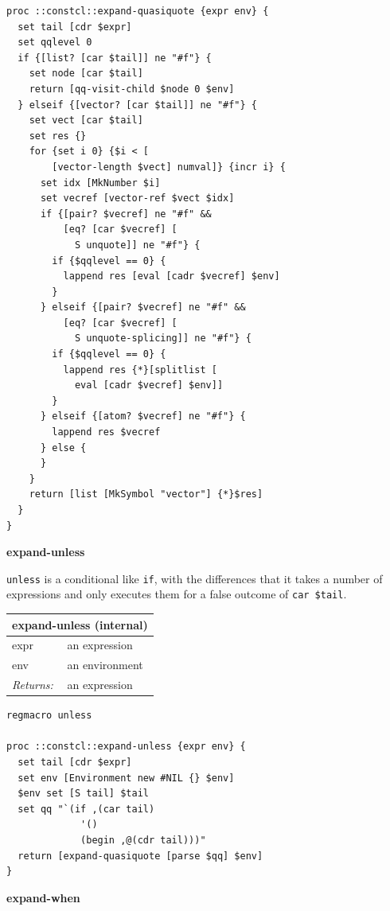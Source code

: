 \documentclass[twoside,9pt]{report}
\begin{document}
\noindent\makebox[\linewidth]{\rule{\linewidth}{0.4pt}}
\begin{lstlisting}
proc ::constcl::expand-quasiquote {expr env} {
  set tail [cdr $expr]
  set qqlevel 0
  if {[list? [car $tail]] ne "#f"} {
    set node [car $tail]
    return [qq-visit-child $node 0 $env]
  } elseif {[vector? [car $tail]] ne "#f"} {
    set vect [car $tail]
    set res {}
    for {set i 0} {$i < [
        [vector-length $vect] numval]} {incr i} {
      set idx [MkNumber $i]
      set vecref [vector-ref $vect $idx]
      if {[pair? $vecref] ne "#f" &&
          [eq? [car $vecref] [
            S unquote]] ne "#f"} {
        if {$qqlevel == 0} {
          lappend res [eval [cadr $vecref] $env]
        }
      } elseif {[pair? $vecref] ne "#f" &&
          [eq? [car $vecref] [
            S unquote-splicing]] ne "#f"} {
        if {$qqlevel == 0} {
          lappend res {*}[splitlist [
            eval [cadr $vecref] $env]]
        }
      } elseif {[atom? $vecref] ne "#f"} {
        lappend res $vecref
      } else {
      }
    }
    return [list [MkSymbol "vector"] {*}$res]
  }
}
\end{lstlisting}
\noindent\makebox[\linewidth]{\rule{\linewidth}{0.4pt}}

\textbf{expand-unless}


\texttt{unless} is a conditional like \texttt{if}, with the differences that it takes a number of expressions and only executes them for a false outcome of \texttt{car \$tail}.

\begin{tabular}{ |l l| }
\hline
\multicolumn{2}{|l|}{expand-unless (internal)} \\
\hline
expr & an expression \\
env & an environment \\
\textit{Returns:} & an expression \\
\hline
\end{tabular}

\noindent\makebox[\linewidth]{\rule{\linewidth}{0.4pt}}
\begin{lstlisting}
regmacro unless
 
proc ::constcl::expand-unless {expr env} {
  set tail [cdr $expr]
  set env [Environment new #NIL {} $env]
  $env set [S tail] $tail
  set qq "`(if ,(car tail)
             '()
             (begin ,@(cdr tail)))"
  return [expand-quasiquote [parse $qq] $env]
}
\end{lstlisting}
\noindent\makebox[\linewidth]{\rule{\linewidth}{0.4pt}}

\textbf{expand-when}
\end{document}
